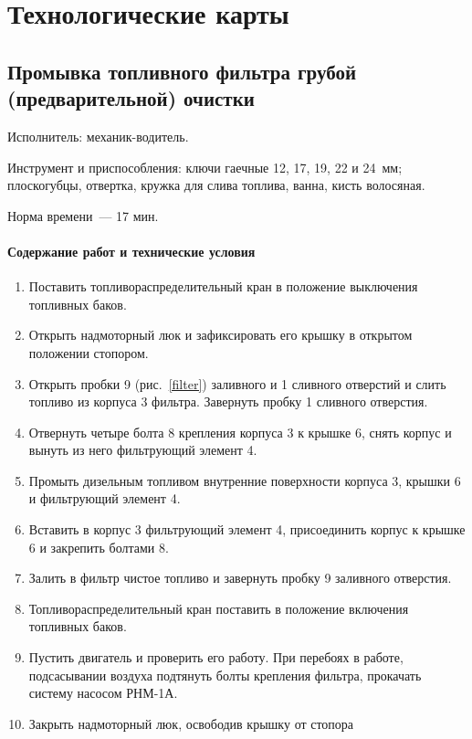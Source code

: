 \chapter{Технологические карты}

\section{Промывка топливного фильтра грубой (предварительной) очистки}
Исполнитель: механик-водитель. 

Инструмент и приспособления: ключи гаечные 12, 17, 19, 22 и 24~мм; плоскогубцы, отвертка, кружка для слива топлива, ванна, кисть волосяная. 

Норма времени~--- 17 мин.

\subsubsection{Содержание работ и технические условия}
\begin{enumerate}
    \item Поставить топливораспределительный кран в положение выключения топливных баков. 
    \item Открыть надмоторный люк и зафиксировать его крышку в открытом положении стопором. 
    \item Открыть пробки 9 (рис.~\ref{filter}) заливного и 1 сливного отверстий и слить топливо из корпуса 3 фильтра. Завернуть пробку 1 сливного отверстия. 
    \item Отвернуть четыре болта 8 крепления корпуса 3 к крышке 6, снять корпус и вынуть из него фильтрующий элемент 4. 
    \item Промыть дизельным топливом внутренние поверхности корпуса 3, крышки 6 и фильтрующий элемент 4. 
    \item Вставить в корпус 3 фильтрующий элемент 4, присоединить корпус к крышке 6 и закрепить болтами 8. 
    \item Залить в фильтр чистое топливо и завернуть пробку 9 заливного отверстия. 
    \item Топливораспределительный кран поставить в положение включения топливных баков. 
    \item Пустить двигатель и проверить его работу. При перебоях в работе, подсасывании воздуха подтянуть болты крепления фильтра, прокачать систему насосом РНМ-1А. 
    \item Закрыть надмоторный люк, освободив крышку от стопора
\end{enumerate}

